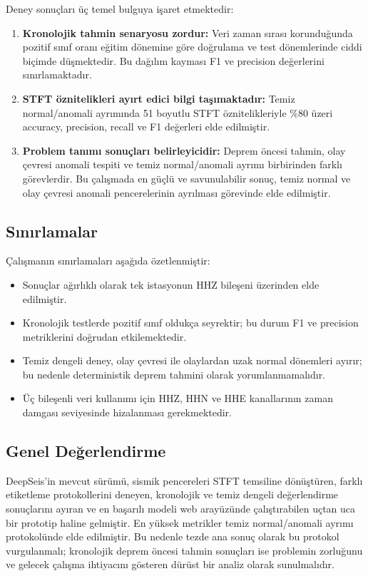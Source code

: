 Deney sonuçları üç temel bulguya işaret etmektedir:

\begin{enumerate}
    \item \textbf{Kronolojik tahmin senaryosu zordur:} Veri zaman sırası korunduğunda pozitif sınıf oranı eğitim dönemine göre doğrulama ve test dönemlerinde ciddi biçimde düşmektedir. Bu dağılım kayması F1 ve precision değerlerini sınırlamaktadır.
    
    \item \textbf{STFT öznitelikleri ayırt edici bilgi taşımaktadır:} Temiz normal/anomali ayrımında 51 boyutlu STFT öznitelikleriyle \%80 üzeri accuracy, precision, recall ve F1 değerleri elde edilmiştir.
    
    \item \textbf{Problem tanımı sonuçları belirleyicidir:} Deprem öncesi tahmin, olay çevresi anomali tespiti ve temiz normal/anomali ayrımı birbirinden farklı görevlerdir. Bu çalışmada en güçlü ve savunulabilir sonuç, temiz normal ve olay çevresi anomali pencerelerinin ayrılması görevinde elde edilmiştir.
\end{enumerate}

\subsection{Sınırlamalar}

Çalışmanın sınırlamaları aşağıda özetlenmiştir:

\begin{itemize}
    \item Sonuçlar ağırlıklı olarak tek istasyonun HHZ bileşeni üzerinden elde edilmiştir.
    \item Kronolojik testlerde pozitif sınıf oldukça seyrektir; bu durum F1 ve precision metriklerini doğrudan etkilemektedir.
    \item Temiz dengeli deney, olay çevresi ile olaylardan uzak normal dönemleri ayırır; bu nedenle deterministik deprem tahmini olarak yorumlanmamalıdır.
    \item Üç bileşenli veri kullanımı için HHZ, HHN ve HHE kanallarının zaman damgası seviyesinde hizalanması gerekmektedir.
\end{itemize}

\subsection{Genel Değerlendirme}

DeepSeis'in mevcut sürümü, sismik pencereleri STFT temsiline dönüştüren, farklı etiketleme protokollerini deneyen, kronolojik ve temiz dengeli değerlendirme sonuçlarını ayıran ve en başarılı modeli web arayüzünde çalıştırabilen uçtan uca bir prototip haline gelmiştir. En yüksek metrikler temiz normal/anomali ayrımı protokolünde elde edilmiştir. Bu nedenle tezde ana sonuç olarak bu protokol vurgulanmalı; kronolojik deprem öncesi tahmin sonuçları ise problemin zorluğunu ve gelecek çalışma ihtiyacını gösteren dürüst bir analiz olarak sunulmalıdır.
